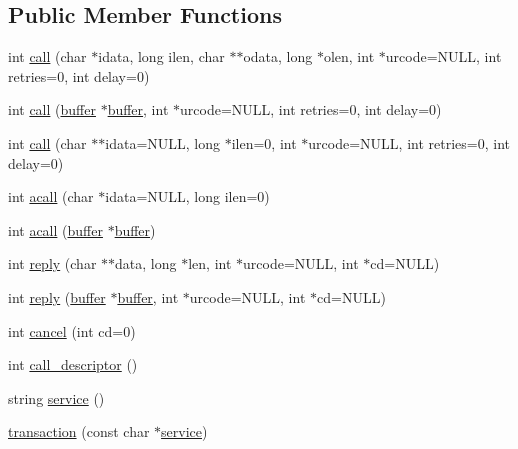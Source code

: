 \subsection*{Public Member Functions}
\begin{DoxyCompactItemize}
\item 
int \hyperlink{classatmi_1_1transaction_a1251381692ec4e235ca9179a84273484}{call} (char $\ast$idata, long ilen, char $\ast$$\ast$odata, long $\ast$olen, int $\ast$urcode=N\+U\+L\+L, int retries=0, int delay=0)
\item 
int \hyperlink{classatmi_1_1transaction_a5cf6cc1130cdf5ab70f8d3a469400921}{call} (\hyperlink{classatmi_1_1buffer}{buffer} $\ast$\hyperlink{classatmi_1_1buffer}{buffer}, int $\ast$urcode=N\+U\+L\+L, int retries=0, int delay=0)
\item 
int \hyperlink{classatmi_1_1transaction_aa5fb9edab0ee78c39b73936ca59a0b02}{call} (char $\ast$$\ast$idata=N\+U\+L\+L, long $\ast$ilen=0, int $\ast$urcode=N\+U\+L\+L, int retries=0, int delay=0)
\item 
int \hyperlink{classatmi_1_1transaction_abf3ecf74af155274d4b500df2e6ec69b}{acall} (char $\ast$idata=N\+U\+L\+L, long ilen=0)
\item 
int \hyperlink{classatmi_1_1transaction_afd2f657d069ff22055720f27cd320934}{acall} (\hyperlink{classatmi_1_1buffer}{buffer} $\ast$\hyperlink{classatmi_1_1buffer}{buffer})
\item 
int \hyperlink{classatmi_1_1transaction_a810c7fdad2bc26722027d4d0565f4c9a}{reply} (char $\ast$$\ast$data, long $\ast$len, int $\ast$urcode=N\+U\+L\+L, int $\ast$cd=N\+U\+L\+L)
\item 
int \hyperlink{classatmi_1_1transaction_a7818572d56203baa700cd80d616b3447}{reply} (\hyperlink{classatmi_1_1buffer}{buffer} $\ast$\hyperlink{classatmi_1_1buffer}{buffer}, int $\ast$urcode=N\+U\+L\+L, int $\ast$cd=N\+U\+L\+L)
\item 
int \hyperlink{classatmi_1_1transaction_a380d536258d33a801973100d6e2ae622}{cancel} (int cd=0)
\item 
int \hyperlink{classatmi_1_1transaction_a11018dd9689a5a66d0510ae78bb048da}{call\+\_\+descriptor} ()
\item 
string \hyperlink{classatmi_1_1transaction_a16d4442ea8f6582ec4820a064fc9a825}{service} ()
\item 
\hyperlink{classatmi_1_1transaction_a0cb59a4954d3fc4b903c0f2876dd00b3}{transaction} (const char $\ast$\hyperlink{classatmi_1_1transaction_a16d4442ea8f6582ec4820a064fc9a825}{service})
\end{DoxyCompactItemize}
